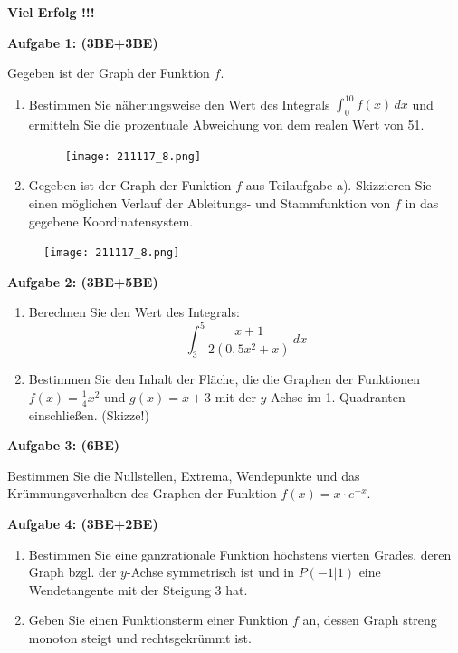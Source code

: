 \documentclass[a4paper,12pt]{article}
\newcommand{\Aufgabe}[1]{
  {
  \vspace*{0.5cm}
  \textsf{\textbf{Aufgabe #1}}
  \vspace*{0.2cm}
  
  }
}
\begin{document}
\vspace{5cm}
\centerline{\huge\bfseries\sffamily Viel Erfolg !!!}

\newpage

\Aufgabe{1: (3BE+3BE)} 
Gegeben ist der Graph der Funktion $f$. 
\begin{enumerate}[label={\alph*)}] 
  \item Bestimmen Sie näherungsweise den Wert des Integrals ${\int_{0}^{10} f(x)\, dx}$ und ermitteln Sie die prozentuale Abweichung von dem realen Wert von 51.
\begin{figure}[H]
  \centering
  \texttt{[image: 211117\_8.png]}
\end{figure}
\newpage
  \item Gegeben ist der Graph der Funktion $f$ aus Teilaufgabe a). Skizzieren Sie einen möglichen Verlauf der Ableitungs- und Stammfunktion von $f$ in das gegebene Koordinatensystem.
\end{enumerate}
\begin{figure}[H]
  \centering
  \texttt{[image: 211117\_8.png]}
\end{figure}


\vspace{1cm}

\Aufgabe{2: (3BE+5BE)} 
\begin{enumerate}[label={\alph*)}] 
  \item Berechnen Sie den Wert des Integrals:
    \[ \int_{3}^{5} \frac{x+1}{2(0,5x^2+x)}\,dx \]
  \item Bestimmen Sie den Inhalt der Fläche, die die Graphen der Funktionen ${f(x)= \frac{1}{4}x^2}$ und ${g(x) = x+3}$ mit der $y$-Achse im 1. Quadranten einschließen. (Skizze!)
\end{enumerate}

\Aufgabe{3: (6BE)} 
Bestimmen Sie die Nullstellen, Extrema, Wendepunkte und das Krümmungsverhalten des Graphen der Funktion ${f(x)=x\cdot e^{-x}}$.

\newpage
\Aufgabe{4: (3BE+2BE)} 
\begin{enumerate}[label={\alph*)}] 
  \item Bestimmen Sie eine ganzrationale Funktion höchstens vierten Grades, deren Graph bzgl. der $y$-Achse symmetrisch ist und in $P (-1|1)$ eine Wendetangente mit der Steigung 3 hat.
  \item Geben Sie einen Funktionsterm einer Funktion $f$ an, dessen Graph streng monoton steigt und rechtsgekrümmt ist.
\end{enumerate}
\end{document}
